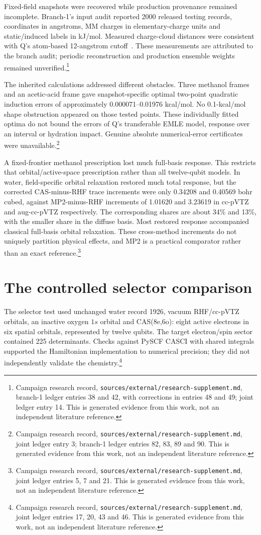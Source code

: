 \documentclass{article}
\newcommand{\record}[1]{\footnote{Campaign research record, \texttt{sources/external/research-supplement.md}, #1. This is generated evidence from this work, not an independent literature reference.}}
\begin{document}
Fixed-field snapshots were recovered while production provenance remained incomplete. Branch-1's input audit reported 2000 released testing records, coordinates in angstroms, MM charges in elementary-charge units and static/induced labels in kJ/mol. Measured charge-cloud distances were consistent with Q's atom-based 12-angstrom cutoff~\cite{Q}. These measurements are attributed to the branch audit; periodic reconstruction and production ensemble weights remained unverified.\record{branch-1 ledger entries 38 and 42, with corrections in entries 48 and 49; joint ledger entry 14}

The inherited calculations addressed different obstacles. Three methanol frames and an acetic-acid frame gave snapshot-specific optimal two-point quadratic induction errors of approximately 0.000071--0.01976 kcal/mol. No 0.1-kcal/mol shape obstruction appeared on those tested points. These individually fitted optima do not bound the errors of Q's transferable EMLE model, response over an interval or hydration impact. Genuine absolute numerical-error certificates were unavailable.\record{joint ledger entry 3; branch-1 ledger entries 82, 83, 89 and 90}

A fixed-frontier methanol prescription lost much full-basis response. This restricts that orbital/active-space prescription rather than all twelve-qubit models. In water, field-specific orbital relaxation restored much total response, but the corrected CAS-minus-RHF trace increments were only 0.34208 and 0.40569 bohr cubed, against MP2-minus-RHF increments of 1.01620 and 3.23619 in cc-pVTZ and aug-cc-pVTZ respectively. The corresponding shares are about 34\% and 13\%, with the smaller share in the diffuse basis. Most restored response accompanied classical full-basis orbital relaxation. These cross-method increments do not uniquely partition physical effects, and MP2 is a practical comparator rather than an exact reference.\record{joint ledger entries 5, 7 and 21}

\section{The controlled selector comparison}
The selector test used unchanged water record 1926, vacuum RHF/cc-pVTZ orbitals, an inactive oxygen \(1s\) orbital and CAS(8e,6o): eight active electrons in six spatial orbitals, represented by twelve qubits. The target electron/spin sector contained 225 determinants. Checks against PySCF CASCI with shared integrals supported the Hamiltonian implementation to numerical precision; they did not independently validate the chemistry.\record{joint ledger entries 17, 20, 43 and 46}
\end{document}
